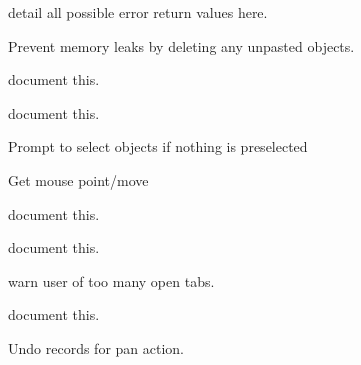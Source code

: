 \begin{DoxyRefList}
\label{todo__todo000006}%
%
detail all possible error return values here.  
\item[Member \mbox{\hyperlink{imgui__main_8c_a5bc5a91adf26b18dd615c83c53483c77}{Main\+Window}} (void)]\label{todo__todo000198}%
%
Prevent memory leaks by deleting any unpasted objects.  
\item[Member \mbox{\hyperlink{imgui__main_8c_a7da395699da3193a09abcddf50c6fb9a}{messagebox\+\_\+action}} (void)]\label{todo__todo000124}%
%
document this.  
\item[Member \mbox{\hyperlink{imgui__main_8c_ada71768b2d9a4eef7469c9aff4d03db3}{mirror\+\_\+selected\+\_\+action}} (Emb\+Line line)]\label{todo__todo000162}%
%
document this.  
\item[Member \mbox{\hyperlink{imgui__main_8c_a55555197c724d3b2a543e87077876399}{move\+\_\+main}} (void)]\label{todo__todo000215}%
%
Prompt to select objects if nothing is preselected  
\item[Member \mbox{\hyperlink{imgui__main_8c_ab1b91aad20b1894b62be5cbc164f212b}{move\+\_\+selected\+\_\+action}} (void)]\label{todo__todo000159}%
%
Get mouse point/move  
\item[Member \mbox{\hyperlink{imgui__main_8c_a100e4694696c327bb497f71863c0c37e}{new\+\_\+file\+\_\+action}} (void)]\label{todo__todo000110}%
%
document this.  
\item[Member \mbox{\hyperlink{imgui__main_8c_a3e00a1cdbdae6386ce975f5f7c725245}{on\+\_\+window\+\_\+activated}} (void)]\label{todo__todo000020}%
%
document this.  
\item[Member \mbox{\hyperlink{imgui__main_8c_a608d581974072ba9dff1f601f0a97092}{open\+\_\+file\+\_\+action}} (int argc, char argv\mbox{[}10\mbox{]}\mbox{[}200\mbox{]})]\label{todo__todo000111}%
%
warn user of too many open tabs.  
\item[Member \mbox{\hyperlink{imgui__main_8c_aa2c0ece5dcf014611883ff57c4c90710}{open\+\_\+recent\+\_\+file}} (void)]\label{todo__todo000201}%
%
document this.  
\item[Member \mbox{\hyperlink{imgui__main_8c_a61c74a220500dc98b0a69f9caa1b606a}{pan\+\_\+action}} (const char $\ast$mode)]\label{todo__todo000113}%
%
Undo records for pan action.  
\item[Member \mbox{\hyperlink{imgui__main_8c_ae0800b18cad9b17d3b26da24544f1d8f}{paste}} (void)]\label{todo__todo000056}%

\end{DoxyRefList}
